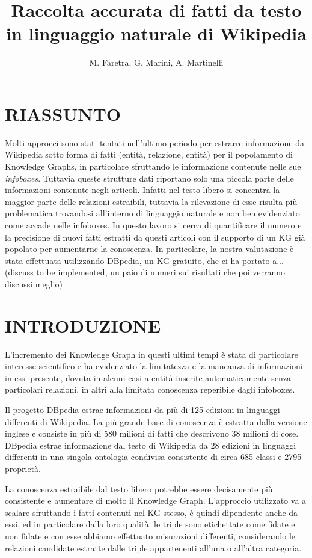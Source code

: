 \documentclass[10pt,a4paper,twocolumn]{article}
\author{M. Faretra, G. Marini, A. Martinelli}
\title{\textbf{Raccolta accurata di fatti da testo in linguaggio naturale di Wikipedia}}
\begin{document}
	
\maketitle
		
\section*{RIASSUNTO}
		
Molti approcci sono stati tentati nell'ultimo periodo per estrarre informazione da Wikipedia sotto forma di fatti (entità, relazione, entità) per il popolamento di Knowledge Graphs, in particolare sfruttando le informazione contenute nelle sue \textit{infoboxes}. Tuttavia queste strutture dati riportano solo una piccola parte delle informazioni contenute negli articoli. Infatti nel testo libero si concentra la maggior parte delle relazioni estraibili, tuttavia la rilevazione di esse risulta più problematica trovandosi all'interno di linguaggio naturale e non ben evidenziato come accade nelle infoboxes. In questo lavoro si cerca di quantificare il numero e la precisione di nuovi fatti estratti da questi articoli con il supporto di un KG già popolato per aumentarne la conoscenza. In particolare, la nostra valutazione è stata effettuata utilizzando DBpedia, un KG gratuito, che ci ha portato a... (discuss to be implemented, un paio di numeri sui risultati che poi verranno discussi meglio)

\section{INTRODUZIONE} 

L'incremento dei Knowledge Graph in questi ultimi tempi è stata di particolare interesse scientifico e ha evidenziato la limitatezza e la mancanza di informazioni in essi presente, dovuta in alcuni casi a entità inserite automaticamente senza particolari relazioni, in altri alla limitata conoscenza reperibile dagli infoboxes.

Il progetto DBpedia estrae informazioni da più di 125 edizioni in linguaggi differenti di Wikipedia. La più grande base di conoscenza è estratta dalla versione inglese e consiste in più di 580 milioni di fatti che descrivono 38 milioni di cose. DBpedia estrae informazione dal testo di  Wikipedia da 28 edizioni in linguaggi differenti in una singola ontologia condivisa consistente di circa 685 classi e 2795 proprietà. 

La conoscenza estraibile dal testo libero potrebbe essere decisamente più consistente e aumentare di molto il Knowledge Graph. L'approccio utilizzato va a scalare sfruttando i fatti contenuti nel KG stesso, è quindi dipendente anche da essi, ed in particolare dalla loro qualità: le triple sono etichettate come fidate e non fidate e con esse abbiamo effettuato misurazioni differenti, considerando le relazioni candidate estratte dalle triple appartenenti all'una o all'altra categoria.
\end{document}
